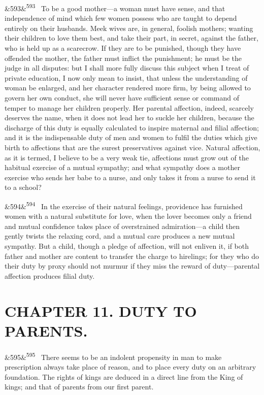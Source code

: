 \documentclass[12pt]{article}
\newcommand{\para}[1][]{\par\noindent\ifx&#1&\else\textsuperscript{\footnotesize #1}~\fi}
\begin{document}
\para[593] To be a good mother---a woman must have sense, and that independence of mind which few women possess who are taught to depend entirely on their husbands. Meek wives are, in general, foolish mothers; wanting their children to love them best, and take their part, in secret, against the father, who is held up as a scarecrow. If they are to be punished, though they have offended the mother, the father must inflict the punishment; he must be the judge in all disputes: but I shall more fully discuss this subject when I treat of private education, I now only mean to insist, that unless the understanding of woman be enlarged, and her character rendered more firm, by being allowed to govern her own conduct, she will never have sufficient sense or command of temper to manage her children properly. Her parental affection, indeed, scarcely deserves the name, when it does not lead her to suckle her children, because the discharge of this duty is equally calculated to inspire maternal and filial affection; and it is the indispensable duty of men and women to fulfil the duties which give birth to affections that are the surest preservatives against vice. Natural affection, as it is termed, I believe to be a very weak tie, affections must grow out of the habitual exercise of a mutual sympathy; and what sympathy does a mother exercise who sends her babe to a nurse, and only takes it from a nurse to send it to a school?

\para[594] In the exercise of their natural feelings, providence has furnished women with a natural substitute for love, when the lover becomes only a friend and mutual confidence takes place of overstrained admiration---a child then gently twists the relaxing cord, and a mutual care produces a new mutual sympathy. But a child, though a pledge of affection, will not enliven it, if both father and mother are content to transfer the charge to hirelings; for they who do their duty by proxy should not murmur if they miss the reward of duty---parental affection produces filial duty.

\section*{CHAPTER 11. DUTY TO PARENTS.}

\para[595] There seems to be an indolent propensity in man to make prescription always take place of reason, and to place every duty on an arbitrary foundation. The rights of kings are deduced in a direct line from the King of kings; and that of parents from our first parent.
\end{document}

